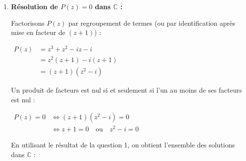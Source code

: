 \documentclass[12pt,a4paper]{article}
\begin{document}
\begin{enumerate}
\begin{enumerate}
        Comme $x \in \mathbb{R}$, $(x^3 + x^2) \in \mathbb{R}$ et $(-x - 1) \in \mathbb{R}$. Par nullité d'un nombre complexe, cela équivaut au système :
        
        $
        \begin{cases}
            x^3 + x^2 = 0 \quad (L_1) \\
            -x - 1 = 0 \quad (L_2)
        \end{cases}
        $
        
        Résolvons $(L_2)$ :
        
        $
        \begin{aligned}
            -x - 1 = 0 &\iff x = -1
        \end{aligned}
        $
        
        Vérifions dans $(L_1)$ :
        
        $
        \begin{aligned}
            (-1)^3 + (-1)^2 &= -1 + 1\\
            &= 0
        \end{aligned}
        $
        
        L'équation $P(z) = 0$ admet donc une unique solution réelle : $\mathbf{z_0 = -1}$.

        \item \textbf{Résolution de $P(z) = 0$ dans $\mathbb{C}$ :}
        
        Factorisons $P(z)$ par regroupement de termes (ou par identification après mise en facteur de $(z + 1)$) :
        
        $
        \begin{aligned}
            P(z) &= z^3 + z^2 - iz - i\\
            &= z^2(z + 1) - i(z + 1)\\
            &= (z + 1)(z^2 - i)
        \end{aligned}
        $
        
        Un produit de facteurs est nul si et seulement si l'un au moins de ses facteurs est nul :
        
        $
        \begin{aligned}
            P(z) = 0 &\iff (z + 1)(z^2 - i) = 0\\
            &\iff z + 1 = 0 \quad \text{ou} \quad z^2 - i = 0
        \end{aligned}
        $
        
        En utilisant le résultat de la question 1, on obtient l'ensemble des solutions dans $\mathbb{C}$ :
        

\end{enumerate}
\end{enumerate}
\end{document}
